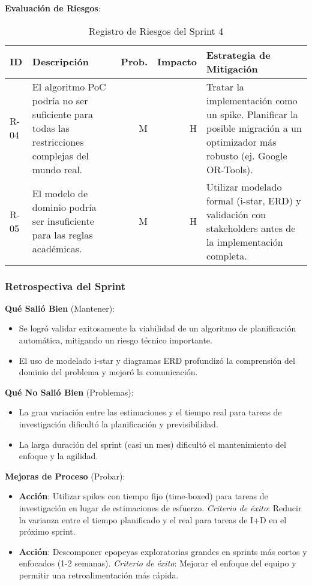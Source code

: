 \textbf{Evaluación de Riesgos}:
\begin{table}[H]
\caption{Registro de Riesgos del Sprint 4}
\label{tab:risk-register-4}
\begin{tabularx}{\textwidth}{@{}lXrrX@{}}
\toprule
\textbf{ID} & \textbf{Descripción} & \textbf{Prob.} & \textbf{Impacto} & \textbf{Estrategia de Mitigación} \\
\midrule
R-04 & El algoritmo PoC podría no ser suficiente para todas las restricciones complejas del mundo real. & M & H & Tratar la implementación como un spike. Planificar la posible migración a un optimizador más robusto (ej. Google OR-Tools). \\
R-05 & El modelo de dominio podría ser insuficiente para las reglas académicas. & M & H & Utilizar modelado formal (i-star, ERD) y validación con stakeholders antes de la implementación completa. \\
\bottomrule
\end{tabularx}
\end{table}

\subsubsection{Retrospectiva del Sprint}

\textbf{Qué Salió Bien} (Mantener):
\begin{itemize}
    \item Se logró validar exitosamente la viabilidad de un algoritmo de planificación automática, mitigando un riesgo técnico importante.
    \item El uso de modelado i-star y diagramas ERD profundizó la comprensión del dominio del problema y mejoró la comunicación.
\end{itemize}

\textbf{Qué No Salió Bien} (Problemas):
\begin{itemize}
    \item La gran variación entre las estimaciones y el tiempo real para tareas de investigación dificultó la planificación y previsibilidad.
    \item La larga duración del sprint (casi un mes) dificultó el mantenimiento del enfoque y la agilidad.
\end{itemize}

\textbf{Mejoras de Proceso} (Probar):
\begin{itemize}
    \item \textbf{Acción}: Utilizar spikes con tiempo fijo (time-boxed) para tareas de investigación en lugar de estimaciones de esfuerzo. \textit{Criterio de éxito}: Reducir la varianza entre el tiempo planificado y el real para tareas de I+D en el próximo sprint.
    \item \textbf{Acción}: Descomponer epopeyas exploratorias grandes en sprints más cortos y enfocados (1-2 semanas). \textit{Criterio de éxito}: Mejorar el enfoque del equipo y permitir una retroalimentación más rápida.
\end{itemize}
